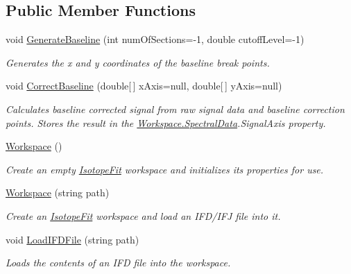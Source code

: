 \subsection*{Public Member Functions}
\begin{DoxyCompactItemize}
\item 
void \hyperlink{class_isotope_fit_1_1_workspace_a80f09325539d16dd9eee6b470316db8b}{Generate\+Baseline} (int num\+Of\+Sections=-\/1, double cutoff\+Level=-\/1)
\begin{DoxyCompactList}\small\item\em Generates the x and y coordinates of the baseline break points. \end{DoxyCompactList}\item 
void \hyperlink{class_isotope_fit_1_1_workspace_aa0b81213937d49ae3a6183563cfe0f60}{Correct\+Baseline} (double\mbox{[}$\,$\mbox{]} x\+Axis=null, double\mbox{[}$\,$\mbox{]} y\+Axis=null)
\begin{DoxyCompactList}\small\item\em Calculates baseline corrected signal from raw signal data and baseline correction points. Stores the result in the \hyperlink{class_isotope_fit_1_1_workspace_a1d6cc2dd07cbfe920da9f1bffc9b32c2}{Workspace.\+Spectral\+Data}.Signal\+Axis property. \end{DoxyCompactList}\item 
\hyperlink{class_isotope_fit_1_1_workspace_affa8b6ac937cee367c225c606782da17}{Workspace} ()
\begin{DoxyCompactList}\small\item\em Create an empty \hyperlink{namespace_isotope_fit}{Isotope\+Fit} workspace and initializes its properties for use. \end{DoxyCompactList}\item 
\hyperlink{class_isotope_fit_1_1_workspace_a5aa1f6546513d331f262d383fe6b0358}{Workspace} (string path)
\begin{DoxyCompactList}\small\item\em Create an \hyperlink{namespace_isotope_fit}{Isotope\+Fit} workspace and load an I\+F\+D/\+I\+FJ file into it. \end{DoxyCompactList}\item 
void \hyperlink{class_isotope_fit_1_1_workspace_a55061c1f05d3e02d2d591fe6211d2f1f}{Load\+I\+F\+D\+File} (string path)
\begin{DoxyCompactList}\small\item\em Loads the contents of an I\+FD file into the workspace. \end{DoxyCompactList}\item 

\end{DoxyCompactItemize}
